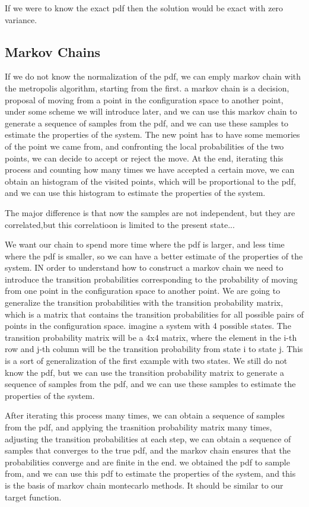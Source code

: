 If we were to know the exact pdf then the solution would be exact with zero variance.

\subsection{Markov Chains}

If we do not know the normalization of the pdf, we can emply markov chain with the metropolis algorithm, starting from the first.
a markov chain is a decision, proposal of moving from a point in the configuration space to another point, under some scheme we will introduce later, and we can use this markov chain to generate a sequence of samples from the pdf, and we can use these samples to estimate the properties of the system. The new point has to have some memories of the point we came from, and confronting the local probabilities of the two points, we can decide to accept or reject the move. At the end, iterating this process and counting how many times we have accepted a certain move, we can obtain an histogram of the visited points, which will be proportional to the pdf, and we can use this histogram to estimate the properties of the system.

The major difference is that now the samples are not independent, but they are correlated,but this correlatioon is limited to the present state...

We want our chain to spend more time where the pdf is larger, and less time where the pdf is smaller, so we can have a better estimate of the properties of the system. IN order to understand how to construct a markov chain we need to introduce the transition probabilities corresponding to the probability of moving from one point in the configuration space to another point. We are going to generalize the transition probabilities with the transition probability matrix, which is a matrix that contains the transition probabilities for all possible pairs of points in the configuration space. imagine a system with 4 possible states. The transition probability matrix will be a 4x4 matrix, where the element in the i-th row and j-th column will be the transition probability from state i to state j. This is a sort of generalization of the first example with two states. We still do not know the pdf, but we can use the transition probability matrix to generate a sequence of samples from the pdf, and we can use these samples to estimate the properties of the system.

After iterating this process many times, we can obtain a sequence of samples from the pdf, and applying the trasnition probability matrix many times, adjusting the transition probabilities at each step, we can obtain a sequence of samples that converges to the true pdf, and the markov chain ensures that the probabilities converge and are finite in the end. we obtained the pdf to sample from, and we can use this pdf to estimate the properties of the system, and this is the basis of markov chain montecarlo methods. It should be similar to our target function.

